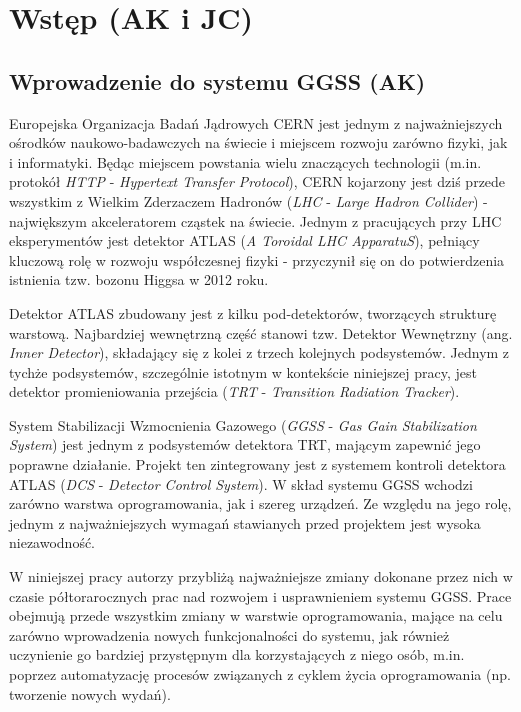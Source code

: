 \chapter{Wstęp (AK i JC)}
\label{cha:wstep}

\section{Wprowadzenie do systemu GGSS (AK)}

Europejska Organizacja Badań Jądrowych CERN jest jednym z najważniejszych ośrodków naukowo-badawczych na świecie i miejscem rozwoju zarówno fizyki, jak i informatyki. Będąc miejscem powstania wielu znaczących technologii (m.in. protokół \emph{HTTP} - \emph{Hypertext Transfer Protocol}), CERN kojarzony jest dziś przede wszystkim z Wielkim Zderzaczem Hadronów (\emph{LHC} - \emph{Large Hadron Collider}) - największym akceleratorem cząstek na świecie. Jednym z pracujących przy LHC eksperymentów jest detektor ATLAS (\emph{A Toroidal LHC ApparatuS}), pełniący kluczową rolę w rozwoju współczesnej fizyki - przyczynił się on do potwierdzenia istnienia tzw. bozonu Higgsa w 2012 roku.

Detektor ATLAS zbudowany jest z kilku pod-detektorów, tworzących strukturę warstową. Najbardziej wewnętrzną część stanowi tzw. Detektor Wewnętrzny (ang. \emph{Inner Detector}), składający się z kolei z trzech kolejnych podsystemów. Jednym z tychże podsystemów, szczególnie istotnym w kontekście niniejszej pracy, jest detektor promieniowania przejścia (\emph{TRT} - \emph{Transition Radiation Tracker}).

System Stabilizacji Wzmocnienia Gazowego (\emph{GGSS} - \emph{Gas Gain Stabilization System}) jest jednym z podsystemów detektora TRT, mającym zapewnić jego poprawne działanie. Projekt ten zintegrowany jest z systemem kontroli detektora ATLAS (\emph{DCS} - \emph{Detector Control System}). W skład systemu GGSS wchodzi zarówno warstwa oprogramowania, jak i szereg urządzeń. Ze względu na jego rolę, jednym z najważniejszych wymagań stawianych przed projektem jest wysoka niezawodność.

W niniejszej pracy autorzy przybliżą najważniejsze zmiany dokonane przez nich w czasie półtorarocznych prac nad rozwojem i usprawnieniem systemu GGSS. Prace obejmują przede wszystkim zmiany w warstwie oprogramowania, mające na celu zarówno wprowadzenia nowych funkcjonalności do systemu, jak również uczynienie go bardziej przystępnym dla korzystających z niego osób, m.in. poprzez automatyzację procesów związanych z cyklem życia oprogramowania (np. tworzenie nowych wydań).


